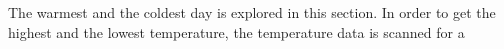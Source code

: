 

The warmest and the coldest day is explored in this section. In order to get the highest and the lowest temperature, the temperature data is scanned for a


